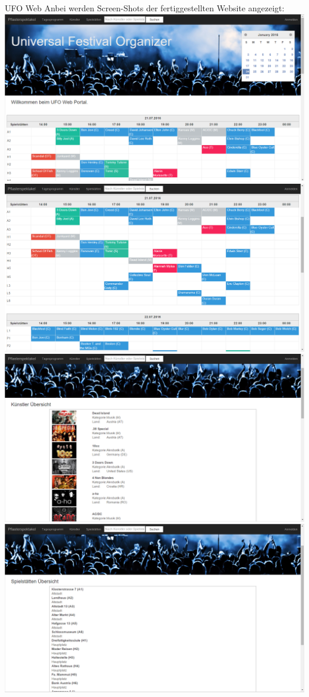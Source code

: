 \begin{section}{UFO Web}
Anbei werden Screen-Shots der fertiggestellten Website angezeigt: \\

\includegraphics[angle=0, scale=0.40]{./img/3_ausb_page1.PNG}
\FloatBarrier
\includegraphics[angle=0, scale=0.40]{./img/3_ausb_page2.PNG}
\FloatBarrier
\includegraphics[angle=0, scale=0.40]{./img/3_ausb_page3.PNG}
\FloatBarrier
\includegraphics[angle=0, scale=0.40]{./img/3_ausb_page4.PNG}

\end{section}
